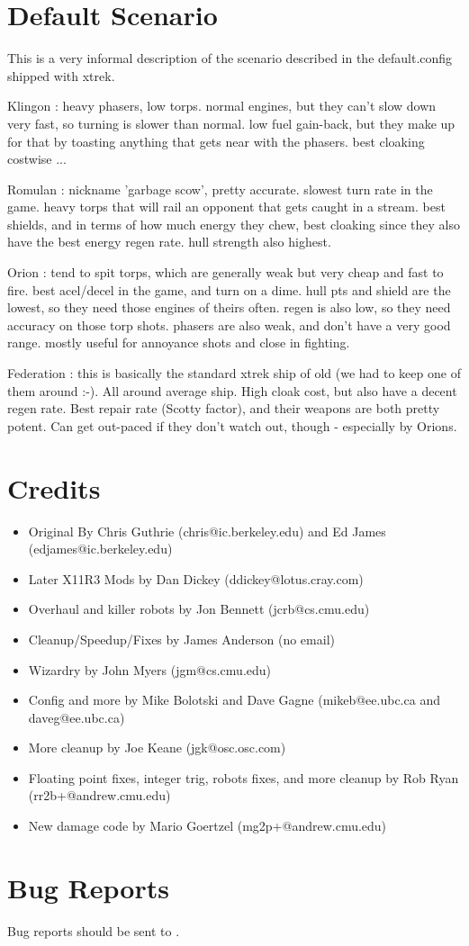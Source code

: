 \section{Default Scenario}

This is a very informal description of the scenario described
in the {\bold default.config} shipped with xtrek.

Klingon : heavy phasers, low torps. normal engines, but they
can't slow down very fast, so turning is slower than normal. low fuel
gain-back, but they make up for that by toasting anything that gets
near with the phasers. best cloaking costwise ...

Romulan : nickname 'garbage scow', pretty accurate. slowest
turn rate in the game. heavy torps that will rail an opponent that
gets caught in a stream. best shields, and in terms of how much energy
they chew, best cloaking since they also have the best energy regen
rate. hull strength also highest.

Orion : tend to spit torps, which are generally weak but very
cheap and fast to fire. best acel/decel in the game, and turn on a
dime. hull pts and shield are the lowest, so they need those engines
of theirs often. regen is also low, so they need accuracy on those
torp shots. phasers are also weak, and don't have a very good range.
mostly useful for annoyance shots and close in fighting.

Federation : this is basically the standard xtrek ship of old
(we had to keep one of them around :-). All around average ship. High
cloak cost, but also have a decent regen rate. Best repair rate
(Scotty factor), and their weapons are both pretty potent. Can get
out-paced if they don't watch out, though - especially by Orions.


\section{Credits}

\begin{itemize}
\item Original By Chris Guthrie (chris@ic.berkeley.edu) and Ed James (edjames@ic.berkeley.edu)
\item Later X11R3 Mods by Dan Dickey (ddickey@lotus.cray.com)  
\item Overhaul and killer robots by Jon Bennett (jcrb@cs.cmu.edu)  
\item Cleanup/Speedup/Fixes by James Anderson (no email)
\item Wizardry by John Myers (jgm@cs.cmu.edu)  
\item Config and more by Mike Bolotski and Dave Gagne (mikeb@ee.ubc.ca and daveg@ee.ubc.ca)
\item More cleanup by Joe Keane (jgk@osc.osc.com)
\item Floating point fixes, integer trig, robots fixes, and more cleanup by Rob Ryan (rr2b+@andrew.cmu.edu)
\item New damage code by Mario Goertzel (mg2p+@andrew.cmu.edu)
\end{itemize}

\section{Bug Reports}

Bug reports should be sent to .


